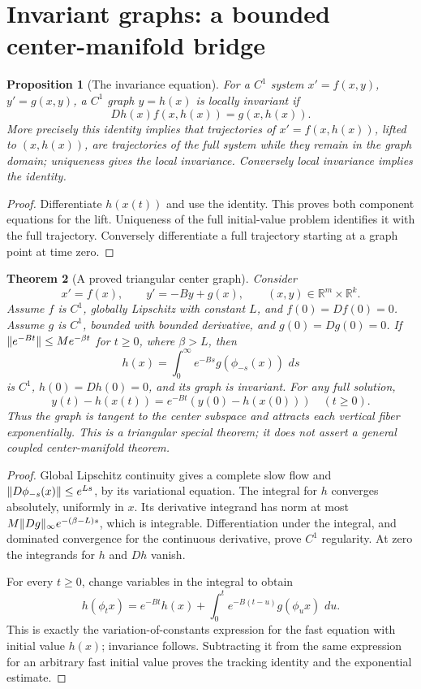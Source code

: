 \documentclass[11pt,oneside]{book}
\newtheorem{theorem}{Theorem}[chapter]
\newtheorem{proposition}[theorem]{Proposition}
\theoremstyle{definition}
\theoremstyle{remark}\newtheorem{remark}[theorem]{Remark}
\newcommand{\R}{\mathbb R}\newcommand{\C}{\mathbb C}
\newcommand{\dd}{\,d}\newcommand{\id}{\operatorname{id}}
\begin{document}
\section{Invariant graphs: a bounded center-manifold bridge}

\begin{proposition}[The invariance equation]\label{d13:16:invariant-graph}
For a \(C^1\) system \(x'=f(x,y)\), \(y'=g(x,y)\), a \(C^1\) graph
\(y=h(x)\) is locally invariant if
\[
 Dh(x)f(x,h(x))=g(x,h(x)).
\]
More precisely this identity implies that trajectories of
\(x'=f(x,h(x))\), lifted to \((x,h(x))\), are trajectories of the
full system while they remain in the graph domain; uniqueness gives
the local invariance. Conversely local invariance implies the identity.
\end{proposition}
\begin{proof}
Differentiate \(h(x(t))\) and use the identity. This proves both component
equations for the lift. Uniqueness of the full initial-value problem
identifies it with the full trajectory. Conversely differentiate a
full trajectory starting at a graph point at time zero.
\end{proof}

\begin{theorem}[A proved triangular center graph]\label{d13:16:triangular-center}
Consider
\[
 x'=f(x),\qquad y'=-By+g(x),\qquad (x,y)\in\R^m\times\R^k.
\]
Assume \(f\) is \(C^1\), globally Lipschitz with constant \(L\), and
\(f(0)=Df(0)=0\). Assume \(g\) is \(C^1\), bounded with bounded
derivative, and \(g(0)=Dg(0)=0\). If
\(\lVert e^{-Bt}\rVert\leq M e^{-\beta t}\) for \(t\geq0\), where
\(\beta>L\), then
\[
 h(x)=\int_0^\infty e^{-Bs}g(\phi_{-s}(x))\,\dd s
\]
is \(C^1\), \(h(0)=Dh(0)=0\), and its graph is invariant.
For any full solution,
\[
 y(t)-h(x(t))=e^{-Bt}(y(0)-h(x(0)))\quad(t\geq0).
\]
Thus the graph is tangent to the center subspace and attracts each
vertical fiber exponentially. This is a triangular special theorem;
it does not assert a general coupled center-manifold theorem.
\end{theorem}
\begin{proof}
Global Lipschitz continuity gives a complete slow flow and
\(\lVert D\phi_{-s}(x)\rVert\leq e^{Ls}\), by its variational equation.
The integral for \(h\) converges absolutely, uniformly in \(x\).
Its derivative integrand has norm at most
\(M\lVert Dg\rVert_\infty e^{-(\beta-L)s}\), which is integrable.
Differentiation under the integral, and dominated convergence for the
continuous derivative, prove \(C^1\) regularity. At zero the integrands
for \(h\) and \(Dh\) vanish.

For every \(t\geq0\), change variables in the integral to obtain
\[
 h(\phi_t x)
 =e^{-Bt}h(x)+\int_0^t e^{-B(t-u)}g(\phi_u x)\,\dd u.
\]
This is exactly the variation-of-constants expression for the fast
equation with initial value \(h(x)\); invariance follows.
Subtracting it from the same expression for an arbitrary fast initial
value proves the tracking identity and the exponential estimate.
\end{proof}
\end{document}
